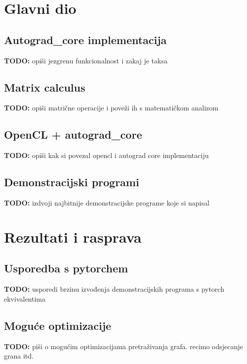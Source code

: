 \documentclass[zavrsnirad]{fer}
\begin{document}
\chapter{Glavni dio}
\label{pog:glavni_dio}

\section{Autograd\_core implementacija}
\textbf{TODO:} opiši jezgrenu funkcionalnost i zakaj je taksa
\blindtext

\pagebreak
\section{Matrix calculus}
\textbf{TODO:} opiši matrične operacije i poveži ih s matematičkom analizom
\blindtext

\pagebreak
\section{OpenCL + autograd\_core}
\textbf{TODO:} opiši kak si povezal opencl i autograd core implementaciju
\blindtext

\pagebreak
\section{Demonstracijski programi}
\textbf{TODO:} izdvoji najbitnije demonstracijske programe koje si napisal
\blindtext

\chapter{Rezultati i rasprava}
\label{pog:rezultati_i_rasprava}

\section{Usporedba s pytorchem}
\textbf{TODO:} usporedi brzinu izvođenja demonstracijskih programa s pytorch ekvivalentima
\blindtext

\pagebreak
\section{Moguće optimizacije}
\textbf{TODO:} piši o mogućim optimizacijama pretraživanja grafa. recimo odsjecanje grana itd.
\blindtext
\end{document}

